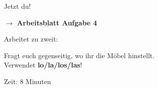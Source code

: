 \documentclass[aspectratio=169, 11pt]{beamer}
\newcommand{\seriftext}[1]{{\fontfamily{ppl}\selectfont #1}}
\newcommand{\es}[1]{\seriftext{\textbf{#1}}}
\newcommand{\abmark}[1]{{\Large$\rightarrow$ \textbf{Arbeitsblatt Aufgabe #1}}}
\begin{document}
\begin{frame}{Jetzt du!}
    \vspace{0.8cm}

    \begin{center}
        \abmark{4}

        \vspace{0.8cm}

        {\large Arbeitet zu zweit:}

        \vspace{0.3cm}

        {\normalsize Fragt euch gegenseitig, wo ihr die Möbel hinstellt.\\
        Verwendet \es{lo/la/los/las}!}

        \vspace{0.5cm}

        {\small Zeit: 8 Minuten}
    \end{center}
\end{frame}

\end{document}
